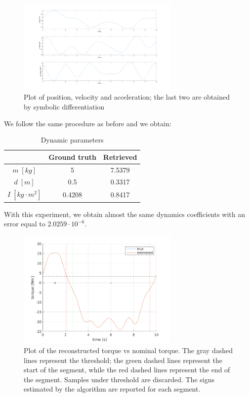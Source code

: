 \documentclass{article}
\begin{document}
\begin{figure}[!htbp]
\centering
\includegraphics[width=0.7\textwidth]{images/1-dof/trajectory1.png}
\caption{Plot of position, velocity and acceleration; the last two are obtained by symbolic differentiation}
\end{figure}
\FloatBarrier

We follow the same procedure as before and we obtain:

\begin{table}[!htbp]
\centering
\begin{tabular}{|c|cc|}
\hline
& Ground truth & Retrieved\\
\hline
$m\;[kg]$ & 5 & 7.5379\\ 
$d\;[m]$ & 0.5 & 0.3317\\
$I\;[kg\cdot m^2]$ & 0.4208 & 0.8417\\
\hline
\end{tabular}
\caption{Dynamic parameters}
\end{table}
\FloatBarrier

With this experiment, we obtain almost the same dynamics coefficients with an error equal to $2.0259\cdot10^{-6}$.

\begin{figure}[!htbp]
\centering
\includegraphics[width=0.7\textwidth]{images/1-dof/results3.png}
\caption{Plot of the reconstructed torque vs nominal torque. The gray dashed lines represent the threshold; the green dashed lines represent the start of the segment, while the red dashed lines represent the end of the segment. Samples under threshold are discarded. The signs estimated by the algorithm are reported for each segment.}
\end{figure}
\FloatBarrier
\end{document}
